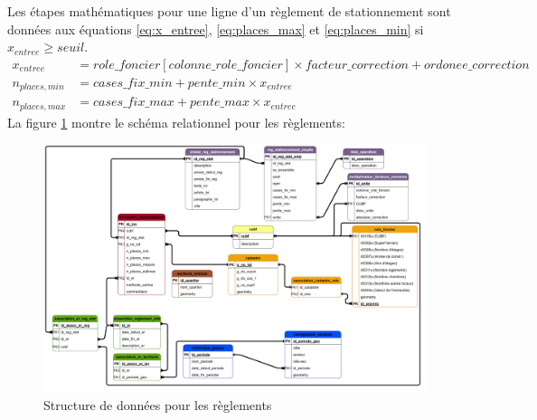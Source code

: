         \FloatBarrier
        Les étapes mathématiques pour une ligne d'un règlement de stationnement sont données aux équations \ref{eq:x_entree}, \ref{eq:places_max} et \ref{eq:places_min} si $x_{entree} \geq seuil $.
        \begin{align}
            x_{entree} &= role\_foncier[colonne\_role\_foncier] \times facteur\_correction \label{eq:x_entree}+ordonee\_correction\\
            n_{places,min} &= cases\_fix\_min + pente\_min \times x_{entree} \label{eq:places_min}\\
            n_{places,max} &= cases\_fix\_max + pente\_max \times x_{entree} \label{eq:places_max}
        \end{align}
        \clearpage
        La figure \ref{fig:offstreet_db_erd_rules} montre le schéma relationnel pour les règlements:
        \begin{figure}[!h]
            \centering
            \includegraphics[trim={85cm 106.25cm 0 0cm}, clip, width=15cm]{dia/ERD_stationnement_propre.png}
            \caption{Structure de données pour les règlements}\label{fig:offstreet_db_erd_rules}
        \end{figure}
        \FloatBarrier
        \clearpage
